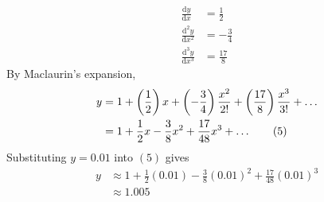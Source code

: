 \documentclass[11pt,a4paper]{book}
\begin{document}
\begin{example}
\begin{align*}
\frac{\mathrm{d}y}{\mathrm{d}x} & =\frac{1}{2}\\
\frac{\mathrm{d}^{2}y}{\mathrm{d}x^{2}} & =-\frac{3}{4}\\
\frac{\mathrm{d}^{3}y}{\mathrm{d}x^{3}} & =\frac{17}{8}
\end{align*}
By Maclaurin's expansion,
\begin{align*}
y & =1+\left(\frac{1}{2}\right)x+\left(-\frac{3}{4}\right)\frac{x^{2}}{2!}+\left(\frac{17}{8}\right)\frac{x^{3}}{3!}+\ldots\\
 & =1+\frac{1}{2}x-\frac{3}{8}x^{2}+\frac{17}{48}x^{3}+\ldots\tag{{5}}
\end{align*}
Substituting $y=0.01$ into $\left(5\right)$ gives
\begin{align*}
y & \approx1+\frac{1}{2}\left(0.01\right)-\frac{3}{8}\left(0.01\right)^{2}+\frac{17}{48}\left(0.01\right)^{3}\\
 & \approx1.005
\end{align*}

\end{example}

\newpage
\end{document}
